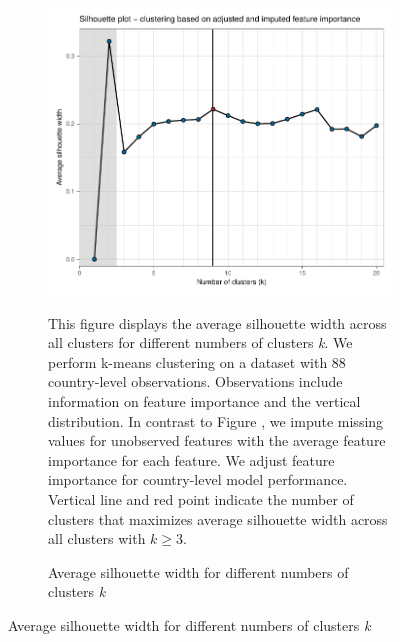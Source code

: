  \begin{figure}[ht!]\ContinuedFloat
   \centering
   \begin{subfigure}[b]{\textwidth}
   \centering
   \includegraphics{Figures_Appendix/Figure_Silhouette_3.pdf}
   \caption{Average silhouette width for different numbers of clusters \textit{k}} \label{fig:G1_silhouette_3}
   \begin{subcaption2}
     This figure displays the average silhouette width across all clusters for different numbers of clusters \textit{k}. We perform k-means clustering on a dataset with 88 country-level observations. Observations include information on feature importance and the vertical distribution. In contrast to Figure , we impute missing values for unobserved features with the average feature importance for each feature. We adjust feature importance for country-level model performance. Vertical line and red point indicate the number of clusters that maximizes average silhouette width across all clusters with $k \geq 3$.
   \end{subcaption2}
   \end{subfigure}
 \end{figure}

 \clearpage

